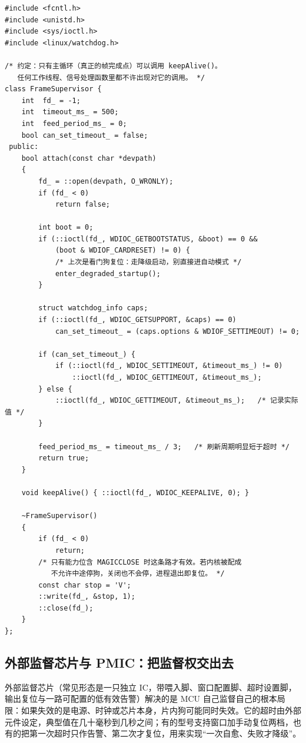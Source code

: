 \documentclass[12pt,a4paper,fontset=fandol]{ctexbook}
\newcommand{\Tp}[1]{\texttt{#1}}
\begin{document}
\begin{lstlisting}[style=cppstyle,caption={C++：\Tp{/dev/watchdog} 用户态监督，按帧刷新并保留启动原因},label={lst:ch04-linux-wdt}]
#include <fcntl.h>
#include <unistd.h>
#include <sys/ioctl.h>
#include <linux/watchdog.h>

/* 约定：只有主循环（真正的帧完成点）可以调用 keepAlive()。
   任何工作线程、信号处理函数里都不许出现对它的调用。 */
class FrameSupervisor {
    int  fd_ = -1;
    int  timeout_ms_ = 500;
    int  feed_period_ms_ = 0;
    bool can_set_timeout_ = false;
 public:
    bool attach(const char *devpath)
    {
        fd_ = ::open(devpath, O_WRONLY);
        if (fd_ < 0)
            return false;

        int boot = 0;
        if (::ioctl(fd_, WDIOC_GETBOOTSTATUS, &boot) == 0 &&
            (boot & WDIOF_CARDRESET) != 0) {
            /* 上次是看门狗复位：走降级启动，别直接进自动模式 */
            enter_degraded_startup();
        }

        struct watchdog_info caps;
        if (::ioctl(fd_, WDIOC_GETSUPPORT, &caps) == 0)
            can_set_timeout_ = (caps.options & WDIOF_SETTIMEOUT) != 0;

        if (can_set_timeout_) {
            if (::ioctl(fd_, WDIOC_SETTIMEOUT, &timeout_ms_) != 0)
                ::ioctl(fd_, WDIOC_GETTIMEOUT, &timeout_ms_);
        } else {
            ::ioctl(fd_, WDIOC_GETTIMEOUT, &timeout_ms_);   /* 记录实际值 */
        }

        feed_period_ms_ = timeout_ms_ / 3;   /* 刷新周期明显短于超时 */
        return true;
    }

    void keepAlive() { ::ioctl(fd_, WDIOC_KEEPALIVE, 0); }

    ~FrameSupervisor()
    {
        if (fd_ < 0)
            return;
        /* 只有能力位含 MAGICCLOSE 时这条路才有效。若内核被配成
           不允许中途停狗，关闭也不会停，进程退出即复位。 */
        const char stop = 'V';
        ::write(fd_, &stop, 1);
        ::close(fd_);
    }
};
\end{lstlisting}

\subsection{外部监督芯片与 PMIC：把监督权交出去}

外部监督芯片（常见形态是一只独立 IC，带喂入脚、窗口配置脚、超时设置脚，输出复位与一路可配置的低有效告警）解决的是 MCU 自己监督自己的根本局限：如果失效的是电源、时钟或芯片本身，片内狗可能同时失效。它的超时由外部元件设定，典型值在几十毫秒到几秒之间；有的型号支持窗口加手动复位两档，也有的把第一次超时只作告警、第二次才复位，用来实现``一次自愈、失败才降级''。
\end{document}
